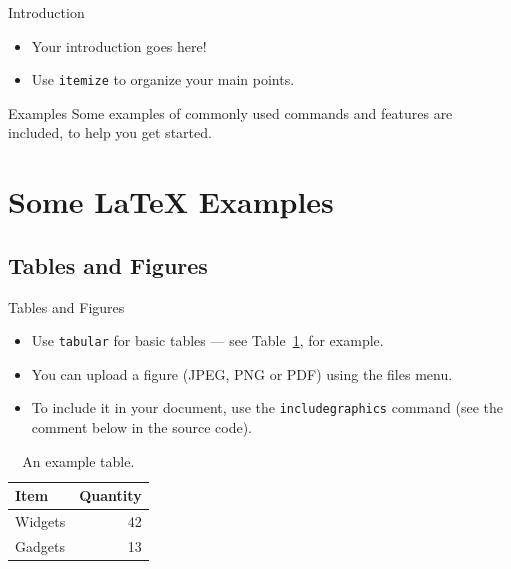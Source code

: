 \documentclass{beamer}
\begin{document}
\begin{frame}{Introduction}

\begin{itemize}
  \item Your introduction goes here!
  \item Use \texttt{itemize} to organize your main points.
\end{itemize}

\begin{block}{Examples}
Some examples of commonly used commands and features are included, to help you get started.
\end{block}

\end{frame}

\section{Some \LaTeX{} Examples}

\subsection{Tables and Figures}

\begin{frame}{Tables and Figures}

\begin{itemize}
\item Use \texttt{tabular} for basic tables --- see Table~\ref{tab:widgets}, for example.
\item You can upload a figure (JPEG, PNG or PDF) using the files menu. 
\item To include it in your document, use the \texttt{includegraphics} command (see the comment below in the source code).
\end{itemize}


\begin{table}
\centering
\begin{tabular}{l|r}
Item & Quantity \\\hline
Widgets & 42 \\
Gadgets & 13
\end{tabular}
\caption{\label{tab:widgets}An example table.}
\end{table}

\end{frame}
\end{document}
